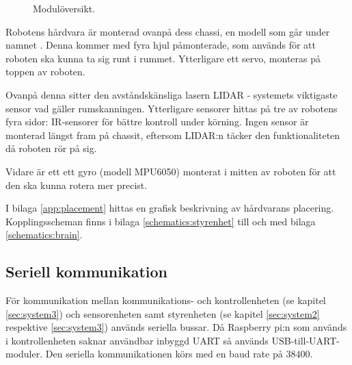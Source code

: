 \documentclass[a4paper,11pt]{article}
\begin{document}
\begin{figure}[h!]
    \caption{Modulöversikt.}
    \label{fig:modules}
\end{figure}

Robotens hårdvara är monterad ovanpå dess chassi, en modell som går under namnet \cite{terminator}. Denna kommer med fyra hjul påmonterade, som används för att roboten ska kunna ta sig runt i rummet. Ytterligare ett servo, monteras på toppen av roboten.

Ovanpå denna sitter den avståndskänsliga lasern LIDAR - systemets viktigaste sensor vad gäller rumskanningen. Ytterligare sensorer hittas på tre av robotens fyra sidor: IR-sensorer för bättre kontroll under körning. Ingen sensor är monterad längst fram på chassit, eftersom LIDAR:n täcker den funktionaliteten då roboten rör på sig.

Vidare är ett ett gyro (modell MPU6050) monterat i mitten av roboten för att den ska kunna rotera mer precist.

I bilaga \ref{app:placement} hittas en grafisk beskrivning av hårdvarans placering. Kopplingsscheman finns i bilaga \ref{schematics:styrenhet} till och med bilaga \ref{schematics:brain}.

\subsection{Seriell kommunikation}
\label{ssec:serial}
För kommunikation mellan kommunikations- och kontrollenheten (se kapitel \ref{sec:system3}) och sensorenheten samt styrenheten (se kapitel \ref{sec:system2} respektive \ref{sec:system3}) används seriella bussar. Då Raspberry pi:n som används i kontrollenheten saknar användbar inbyggd UART så används USB-till-UART-moduler. Den seriella kommunikationen körs med en baud rate på $38 400$.
\end{document}
